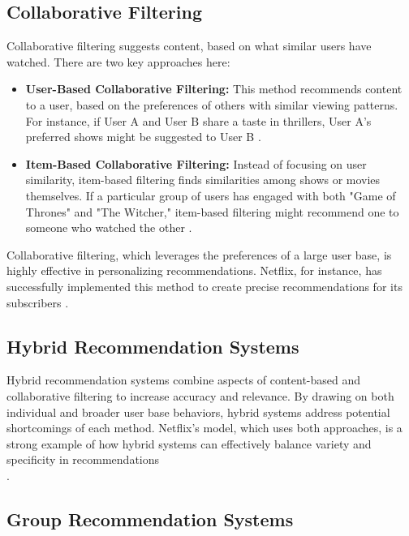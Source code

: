 \documentclass[12pt,english,a4paper]{article}
\begin{document}
\subsection{Collaborative Filtering}

\hspace*{2em}Collaborative filtering suggests content, based on what similar users have watched. There are two key approaches here:

\begin{itemize}
    \item \textbf{User-Based Collaborative Filtering:} This method recommends content to a user, based on the preferences of others with similar viewing patterns. For instance, if User A and User B share a taste in thrillers, User A’s preferred shows might be suggested to User B \cite{Lubos2023,Dang2021}.
    
    \item \textbf{Item-Based Collaborative Filtering:} Instead of focusing on user similarity, item-based filtering finds similarities among shows or movies themselves. If a particular group of users has engaged with both "Game of Thrones" and "The Witcher," item-based filtering might recommend one to someone who watched the other \cite{Lubos2023,Dang2021}.
\end{itemize}

Collaborative filtering, which leverages the preferences of a large user base, is highly effective in personalizing recommendations. Netflix, for instance, has successfully implemented this method to create precise recommendations for its subscribers \cite{Steck20217,Mu2023}.

\subsection{Hybrid Recommendation Systems}

\hspace*{2em}Hybrid recommendation systems combine aspects of content-based and collaborative filtering to increase accuracy and relevance. By drawing on both individual and broader user base behaviors, hybrid systems address potential shortcomings of each method. Netflix’s model, which uses both approaches, is a strong example of how hybrid systems can effectively balance variety and specificity in recommendations\\\cite{Lubos2023,Dang2021}.

\subsection{Group Recommendation Systems}
\end{document}
